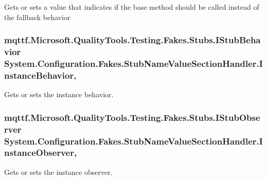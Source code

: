 Gets or sets a value that indicates if the base method should be called instead of the fallback behavior

\hypertarget{class_system_1_1_configuration_1_1_fakes_1_1_stub_name_value_section_handler_a1124cf4271096dc109ca6ca1e6d2cf37}{
\subsubsection[{Instance\-Behavior}]{\setlength{\rightskip}{0pt plus 5cm}mqttf.\-Microsoft.\-Quality\-Tools.\-Testing.\-Fakes.\-Stubs.\-I\-Stub\-Behavior System.\-Configuration.\-Fakes.\-Stub\-Name\-Value\-Section\-Handler.\-Instance\-Behavior\hspace{0.3cm}{\ttfamily [get]}, {\ttfamily [set]}}}\label{class_system_1_1_configuration_1_1_fakes_1_1_stub_name_value_section_handler_a1124cf4271096dc109ca6ca1e6d2cf37}


Gets or sets the instance behavior.

\hypertarget{class_system_1_1_configuration_1_1_fakes_1_1_stub_name_value_section_handler_a6be65ca27800c5e6c4fdf2657d4bad19}{
\subsubsection[{Instance\-Observer}]{\setlength{\rightskip}{0pt plus 5cm}mqttf.\-Microsoft.\-Quality\-Tools.\-Testing.\-Fakes.\-Stubs.\-I\-Stub\-Observer System.\-Configuration.\-Fakes.\-Stub\-Name\-Value\-Section\-Handler.\-Instance\-Observer\hspace{0.3cm}{\ttfamily [get]}, {\ttfamily [set]}}}\label{class_system_1_1_configuration_1_1_fakes_1_1_stub_name_value_section_handler_a6be65ca27800c5e6c4fdf2657d4bad19}


Gets or sets the instance observer.

